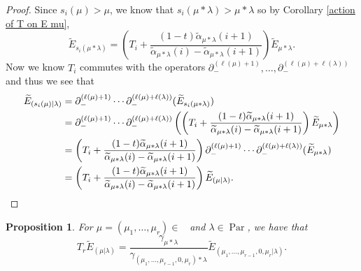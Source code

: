 \documentclass[11pt]{article}
\newtheorem{prop}[theo]{Proposition}
\theoremstyle{definition}
\numberwithin{equation}{section}
\DeclareMathOperator{\Par}{\mathrm{Par}}
\DeclareMathOperator{\Compred}{\mathrm{Comp}^{\textit{red}}}
\begin{document}
\begin{proof}
Since $s_i(\mu) > \mu$, we know that $s_i(\mu*\lambda) > \mu*\lambda$ so by Corollary \ref{action of T on E mu},
$$\widetilde{E}_{s_i(\mu*\lambda)} = 
  \left( T_i + \frac{(1-t)\widetilde{\alpha}_{\mu*\lambda}(i+1)}{\widetilde{\alpha}_{\mu*\lambda}(i)- \widetilde{\alpha}_{\mu*\lambda}(i+1)} \right)  \widetilde{E}_{\mu*\lambda}. $$
Now we know $T_i$ commutes with the operators $\partial_{-}^{(\ell(\mu)+1)},\ldots , \partial_{-}^{(\ell(\mu)+\ell(
\lambda))}$ and thus we see that 
\begin{align*}
    \widetilde{E}_{(s_i(\mu)|\lambda)}&= \partial_{-}^{(\ell(\mu)+1)}\cdots \partial_{-}^{(\ell(\mu)+\ell(
\lambda))} (\widetilde{E}_{s_i(\mu*\lambda)}) \\
&= \partial_{-}^{(\ell(\mu)+1)}\cdots \partial_{-}^{(\ell(\mu)+\ell(
\lambda))} \left( \left( T_i + \frac{(1-t)\widetilde{\alpha}_{\mu*\lambda}(i+1)}{\widetilde{\alpha}_{\mu*\lambda}(i)- \widetilde{\alpha}_{\mu*\lambda}(i+1)} \right)  \widetilde{E}_{\mu*\lambda}\right) \\
&= \left( T_i + \frac{(1-t)\widetilde{\alpha}_{\mu*\lambda}(i+1)}{\widetilde{\alpha}_{\mu*\lambda}(i)- \widetilde{\alpha}_{\mu*\lambda}(i+1)} \right) \partial_{-}^{(\ell(\mu)+1)}\cdots \partial_{-}^{(\ell(\mu)+\ell(
\lambda))}(\widetilde{E}_{\mu*\lambda}) \\
&= \left( T_i + \frac{(1-t)\widetilde{\alpha}_{\mu*\lambda}(i+1)}{\widetilde{\alpha}_{\mu*\lambda}(i)- \widetilde{\alpha}_{\mu*\lambda}(i+1)} \right) \widetilde{E}_{(\mu|\lambda)}. \qedhere
\end{align*}
\end{proof}


\begin{prop}
    For $\mu = (\mu_1,\ldots, \mu_r) \in \Compred$ and $\lambda \in \Par$, we have that
    \begin{equation}
        T_r\widetilde{E}_{(\mu|\lambda)} = \frac{\gamma_{\mu*\lambda}}{\gamma_{(\mu_1,\ldots,\mu_{r-1},0,\mu_r)*\lambda}} \widetilde{E}_{(\mu_1,\ldots,\mu_{r-1},0,\mu_r|\lambda)}.
    \end{equation}
\end{prop}
\end{document}
